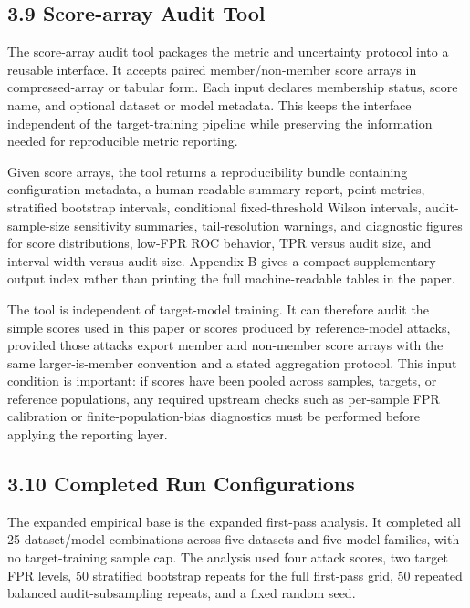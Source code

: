 \documentclass[
  10pt,
  twocolumn]{article}
\begin{document}
\hypertarget{score-array-audit-tool}{%
\subsection{3.9 Score-array Audit Tool}\label{score-array-audit-tool}}

The score-array audit tool packages the metric and uncertainty protocol into a reusable interface. It accepts paired member/non-member score arrays in compressed-array or tabular form. Each input declares membership status, score name, and optional dataset or model metadata. This keeps the interface independent of the target-training pipeline while preserving the information needed for reproducible metric reporting.

Given score arrays, the tool returns a reproducibility bundle containing configuration metadata, a human-readable summary report, point metrics, stratified bootstrap intervals, conditional fixed-threshold Wilson intervals, audit-sample-size sensitivity summaries, tail-resolution warnings, and diagnostic figures for score distributions, low-FPR ROC behavior, TPR versus audit size, and interval width versus audit size. Appendix B gives a compact supplementary output index rather than printing the full machine-readable tables in the paper.

The tool is independent of target-model training. It can therefore audit the simple scores used in this paper or scores produced by reference-model attacks, provided those attacks export member and non-member score arrays with the same larger-is-member convention and a stated aggregation protocol. This input condition is important: if scores have been pooled across samples, targets, or reference populations, any required upstream checks such as per-sample FPR calibration or finite-population-bias diagnostics must be performed before applying the reporting layer.

\hypertarget{completed-run-configurations}{%
\subsection{3.10 Completed Run Configurations}\label{completed-run-configurations}}

The expanded empirical base is the expanded first-pass analysis. It completed all 25 dataset/model combinations across five datasets and five model families, with no target-training sample cap. The analysis used four attack scores, two target FPR levels, 50 stratified bootstrap repeats for the full first-pass grid, 50 repeated balanced audit-subsampling repeats, and a fixed random seed.
\end{document}
